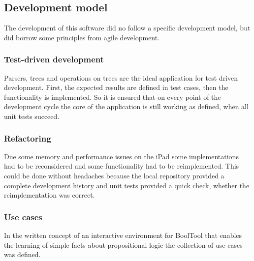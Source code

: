 \subsection{Development model}

The development of this software did no follow a specific development model, 
but did borrow some principles from agile development.

\subsubsection{Test-driven development}

Parsers, trees and operations on trees are the ideal application for test driven development.
First, the expected results are defined in test cases, then the functionality is implemented.
So it is ensured that on every point of the development cycle 
the core of the application is still working as defined,
when all unit tests succeed.


\subsubsection{Refactoring}

Due some memory and performance issues on the iPad 
some implementations had to be reconsidered 
and some functionality had to be reimplemented.
This could be done without headaches because 
the local repository provided a complete development history 
and unit tests provided a quick check, whether the reimplementation was correct.


\subsubsection{Use cases}

In the written concept of an interactive environment for BoolTool that enables the learning  of simple facts about propositional logic the collection of use cases was defined.

